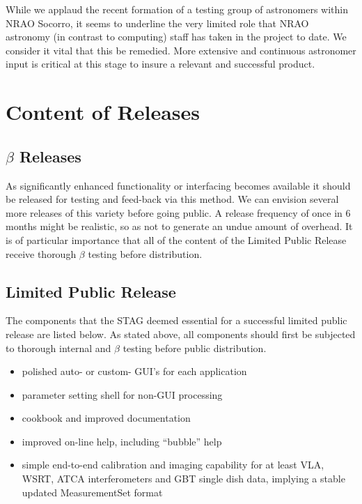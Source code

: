 While we applaud the recent formation of a testing group of
astronomers within NRAO Socorro, it seems to underline the very
limited role that NRAO astronomy (in contrast to computing) staff has
taken in the project to date. We consider it vital that this be
remedied. More extensive and continuous astronomer input is critical
at this stage to insure a relevant and successful product.

\section{Content of Releases}

\subsection{$\beta$ Releases}

As significantly enhanced functionality or interfacing becomes
available it should be released for testing and feed-back via this
method. We can envision several more releases of this variety before
going public. A release frequency of once in 6 months might be
realistic, so as not to generate an undue amount of overhead. It is of
particular importance that all of the content of the Limited Public
Release receive thorough $\beta$ testing before distribution. 

\subsection{Limited Public Release}

The components that the STAG deemed essential for a successful limited
public release are listed below. As stated above, all components
should first be subjected to thorough internal and $\beta$ testing
before public distribution.

\begin{itemize}
\item  polished auto- or custom- GUI's for each application 

\item  parameter setting shell for non-GUI processing

\item  cookbook and improved documentation 

\item  improved on-line help, including ``bubble'' help
  
\item simple end-to-end calibration and imaging capability for at
  least VLA, WSRT, ATCA interferometers and GBT single dish data,
  implying a stable updated MeasurementSet format
\end{itemize}



